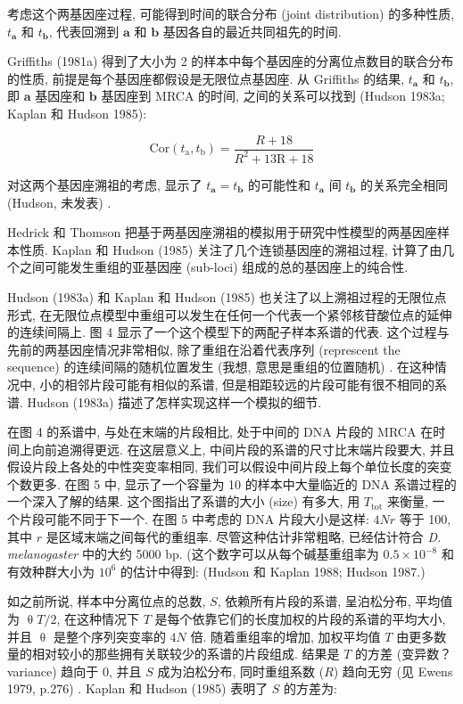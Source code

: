 \documentclass[
    12pt,%
    ]{article}
\begin{document}
考虑这个两基因座过程, 可能得到时间的联合分布 (joint distribution) 的多种性质, $t_{\mathbf{a}}$ 和
$t_{\mathbf{b}}$, 代表回溯到 $\mathbf{a}$ 和 $\mathbf{b}$ 基因各自的最近共同祖先的时间.

Griffiths (1981a) 得到了大小为 2 的样本中每个基因座的分离位点数目的联合分布的性质,
前提是每个基因座都假设是无限位点基因座. 从 Griffiths 的结果, $t_{\mathbf{a}}$ 和 $t_{\mathbf{b}}$, 即
$\mathbf{a}$ 基因座和 $\mathbf{b}$ 基因座到 MRCA 的时间, 之间的关系可以找到 (Hudson 1983a; Kaplan 和 Hudson
1985):

\begin{equation} \label{eq:13}
    \text{Cor}(t_{\mathrm{a}},t_{\mathrm{b}})=\frac{R+18}{R^{2}+13\mathrm{R}+18}
\end{equation}

对这两个基因座溯祖的考虑, 显示了 $t_{\mathbf{a}}=t_{\mathbf{b}}$ 的可能性和 $t_{\mathbf{a}}$ 间
$t_{\mathbf{b}}$ 的关系完全相同 (Hudson, 未发表) .

Hedrick 和 Thomson 把基于两基因座溯祖的模拟用于研究中性模型的两基因座样本性质. Kaplan 和 Hudson (1985)
关注了几个连锁基因座的溯祖过程, 计算了由几个之间可能发生重组的亚基因座 (sub-loci) 组成的总的基因座上的纯合性.

Hudson (1983a) 和 Kaplan 和 Hudson (1985) 也关注了以上溯祖过程的无限位点形式,
在无限位点模型中重组可以发生在任何一个代表一个紧邻核苷酸位点的延伸的连续间隔上. 图 4
显示了一个这个模型下的两配子样本系谱的代表. 这个过程与先前的两基因座情况非常相似, 除了重组在沿着代表序列 (represcent the
sequence) 的连续间隔的随机位置发生 (我想, 意思是重组的位置随机) . 在这种情况中, 小的相邻片段可能有相似的系谱,
但是相距较远的片段可能有很不相同的系谱. Hudson (1983a) 描述了怎样实现这样一个模拟的细节.

在图 4 的系谱中, 与处在末端的片段相比, 处于中间的 DNA 片段的 MRCA 在时间上向前追溯得更远. 在这层意义上,
中间片段的系谱的尺寸比末端片段要大, 并且假设片段上各处的中性突变率相同, 我们可以假设中间片段上每个单位长度的突变个数更多.
在图 5 中, 显示了一个容量为 10 的样本中大量临近的 DNA 系谱过程的一个深入了解的结果. 这个图指出了系谱的大小 (size)
有多大, 用 $T_{\text{tot}}$ 来衡量, 一个片段可能不同于下一个. 在图 5 中考虑的 DNA 片段大小是这样: $4Nr$ 等于 100, 其中
$r$ 是区域末端之间每代的重组率. 尽管这种估计非常粗略, 已经估计符合 \textit{D. melanogaster} 中的大约 5000 bp.
(这个数字可以从每个碱基重组率为 $0.5\times 10^{-8}$ 和有效种群大小为 $10^{6}$ 的估计中得到:  (Hudson 和 Kaplan
1988; Hudson 1987.)

如之前所说, 样本中分离位点的总数, $S$, 依赖所有片段的系谱, 呈泊松分布, 平均值为 $\uptheta T/2$, 在这种情况下 $T$
是每个依靠它们的长度加权的片段的系谱的平均大小, 并且 $\uptheta$ 是整个序列突变率的 $4N$ 倍. 随着重组率的增加, 加权平均值
$T$ 由更多数量的相对较小的那些拥有关联较少的系谱的片段组成. 结果是 $T$ 的方差 (变异数？ variance) 趋向于 0, 并且 $S$
成为泊松分布, 同时重组系数 ($R$) 趋向无穷 (见 Ewens 1979, p.276) . Kaplan 和 Hudson (1985) 表明了 $S$
的方差为:
\end{document}
